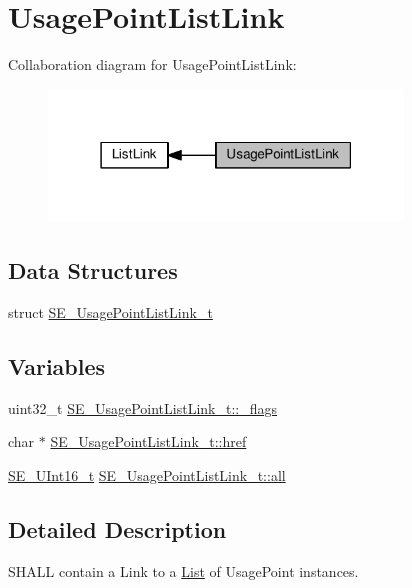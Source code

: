 \hypertarget{group__UsagePointListLink}{}\section{Usage\+Point\+List\+Link}
\label{group__UsagePointListLink}
Collaboration diagram for Usage\+Point\+List\+Link\+:\nopagebreak
\begin{figure}[H]
\begin{center}
\leavevmode
\includegraphics[width=267pt]{group__UsagePointListLink}
\end{center}
\end{figure}
\subsection*{Data Structures}
\begin{DoxyCompactItemize}
\item 
struct \hyperlink{structSE__UsagePointListLink__t}{S\+E\+\_\+\+Usage\+Point\+List\+Link\+\_\+t}
\end{DoxyCompactItemize}
\subsection*{Variables}
\begin{DoxyCompactItemize}
\item 
uint32\+\_\+t \hyperlink{group__UsagePointListLink_gac8530fb930140ba77346df8dbd8c7f34}{S\+E\+\_\+\+Usage\+Point\+List\+Link\+\_\+t\+::\+\_\+flags}
\item 
char $\ast$ \hyperlink{group__UsagePointListLink_gad24ca03d23c037649b06258caa10524e}{S\+E\+\_\+\+Usage\+Point\+List\+Link\+\_\+t\+::href}
\item 
\hyperlink{group__UInt16_gac68d541f189538bfd30cfaa712d20d29}{S\+E\+\_\+\+U\+Int16\+\_\+t} \hyperlink{group__UsagePointListLink_ga8d1a435546d34b5044cd257654412458}{S\+E\+\_\+\+Usage\+Point\+List\+Link\+\_\+t\+::all}
\end{DoxyCompactItemize}


\subsection{Detailed Description}
S\+H\+A\+LL contain a Link to a \hyperlink{structList}{List} of Usage\+Point instances. 

